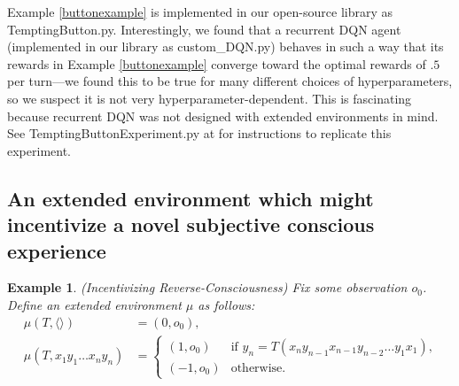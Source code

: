 \documentclass{article}
\newtheorem{myexample}[mytheorem]{Example}
\begin{document}
Example \ref{buttonexample} is implemented in our open-source library
as TemptingButton.py.
Interestingly, we found that
a recurrent DQN agent (implemented in our library as custom\_DQN.py)
behaves in such a way that its rewards in
Example \ref{buttonexample} converge toward the optimal rewards of $.5$ per turn---we
found this to be true for many different choices of hyperparameters, so we suspect
it is not very hyperparameter-dependent.
This is fascinating because recurrent DQN
was not designed with extended environments in mind.
See TemptingButtonExperiment.py at \cite{library} for instructions to replicate
this experiment.

\subsection{An extended environment which might incentivize a novel subjective
conscious experience}

\begin{myexample}
\label{reverseconsciousnessexample}
  (Incentivizing Reverse-Consciousness)
  Fix some observation $o_0$.
  Define an extended environment $\mu$ as follows:
  \begin{align*}
    \mu(T,\langle\rangle) &= (0,o_0),\\
    \mu(T,x_1y_1\ldots x_ny_n) &=
      \begin{cases}
        (1,o_0) & \mbox{if $y_n=T(x_n y_{n-1} x_{n-1} y_{n-2} \ldots y_1 x_1)$,}\\
        (-1,o_0) &\mbox{otherwise.}
      \end{cases}
  \end{align*}
\end{myexample}
\end{document}
